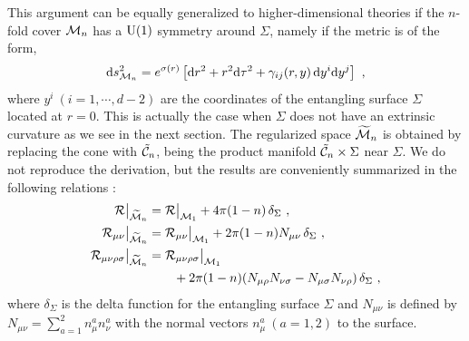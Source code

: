 This argument can be equally generalized to higher-dimensional theories if the $n$-fold cover ${\cal M}_n$ has a $\mathrm{U}(1)$ symmetry around $\Sigma$, namely if the metric is of the form,
\begin{align}\label{U(1)metric}
	\mathrm{d} s^2_{{\cal M}_n} = e^{\sigma (r)} \left[ \mathrm{d} r^2 + r^2 \mathrm{d}\tau^2 + \gamma_{ij}(r, y)\, \mathrm{d} y^i \mathrm{d} y^j \right] \ ,
\end{align}
where $y^i~(i=1,\cdots, d-2)$ are the coordinates of the entangling surface $\Sigma$ located at $r=0$.
This is actually the case when $\Sigma$ does not have an extrinsic curvature as we see in the next section.
The regularized space $\widetilde {{\cal M}}_n$ is obtained by replacing the cone with $\tilde {{\cal C}}_n$, being the product manifold $\tilde {{\cal C}}_n \times \Sigma$ near $\Sigma$.
We do not reproduce the derivation, but
the results are conveniently summarized in the following relations \cite{Fursaev:1995ef}:
\begin{align}\label{Formula}
\begin{aligned}
	{\cal R}\big|_{\widetilde{{\cal M}}_n} &= {\cal R}\big|_{{\cal M}_1} + 4\pi (1-n)\, \delta_\Sigma \ , \\
	{\cal R}_{\mu\nu}\big|_{\widetilde{{\cal M}}_n} &= {\cal R}_{\mu\nu}\big|_{{\cal M}_1} + 2\pi (1-n) N_{\mu\nu}\, \delta_\Sigma \ ,\\
	{\cal R}_{\mu\nu\rho\sigma}\big|_{\widetilde{{\cal M}}_n} &= {\cal R}_{\mu\nu\rho\sigma}\big|_{{\cal M}_1} \\
		&\qquad + 2\pi (1-n) (N_{\mu\rho}N_{\nu\sigma}-
	N_{\mu\sigma}N_{\nu\rho})\, \delta_\Sigma \ ,
\end{aligned}
\end{align}
where $\delta_\Sigma$ is the delta function for the entangling surface $\Sigma$ and $N_{\mu\nu}$ is defined by  $N_{\mu\nu}= \sum_{a=1}^2 n^a_\mu n^a_\nu$ with the normal vectors $n^a_\mu~(a=1,2)$ to the surface.

